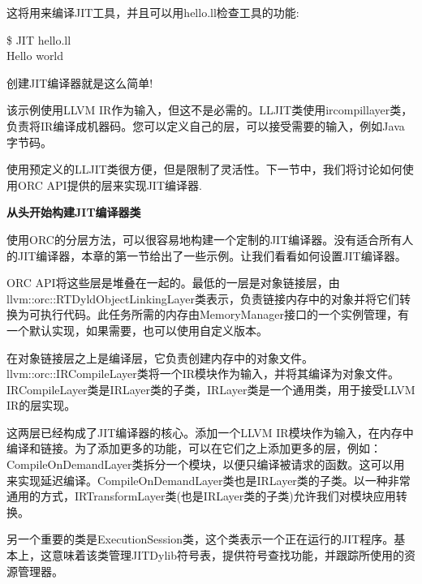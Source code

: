 这将用来编译JIT工具，并且可以用hello.ll检查工具的功能:\par

\begin{tcolorbox}[colback=white,colframe=black]
\$ JIT hello.ll \\
Hello world
\end{tcolorbox}

创建JIT编译器就是这么简单!\par

该示例使用LLVM IR作为输入，但这不是必需的。LLJIT类使用ircompillayer类，负责将IR编译成机器码。您可以定义自己的层，可以接受需要的输入，例如Java字节码。\par

使用预定义的LLJIT类很方便，但是限制了灵活性。下一节中，我们将讨论如何使用ORC API提供的层来实现JIT编译器.\par

\hspace*{\fill} \par %
\textbf{从头开始构建JIT编译器类}

使用ORC的分层方法，可以很容易地构建一个定制的JIT编译器。没有适合所有人的JIT编译器，本章的第一节给出了一些示例。让我们看看如何设置JIT编译器。\par

ORC API将这些层是堆叠在一起的。最低的一层是对象链接层，由llvm::orc::RTDyldObjectLinkingLayer类表示，负责链接内存中的对象并将它们转换为可执行代码。此任务所需的内存由MemoryManager接口的一个实例管理，有一个默认实现，如果需要，也可以使用自定义版本。\par

在对象链接层之上是编译层，它负责创建内存中的对象文件。llvm::orc::IRCompileLayer类将一个IR模块作为输入，并将其编译为对象文件。IRCompileLayer类是IRLayer类的子类，IRLayer类是一个通用类，用于接受LLVM IR的层实现。\par

这两层已经构成了JIT编译器的核心。添加一个LLVM IR模块作为输入，在内存中编译和链接。为了添加更多的功能，可以在它们之上添加更多的层，例如：CompileOnDemandLayer类拆分一个模块，以便只编译被请求的函数。这可以用来实现延迟编译。CompileOnDemandLayer类也是IRLayer类的子类。以一种非常通用的方式，IRTransformLayer类(也是IRLayer类的子类)允许我们对模块应用转换。\par

另一个重要的类是ExecutionSession类，这个类表示一个正在运行的JIT程序。基本上，这意味着该类管理JITDylib符号表，提供符号查找功能，并跟踪所使用的资源管理器。\par

